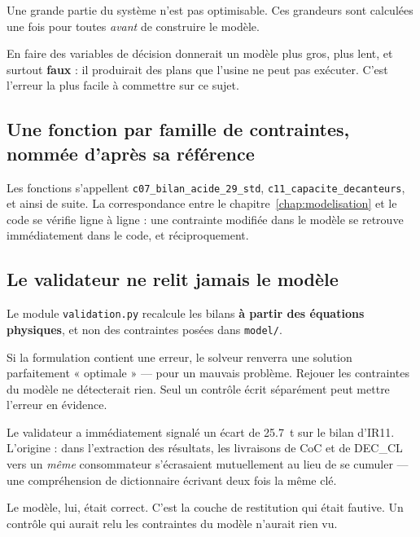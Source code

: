Une grande partie du système n'est pas optimisable. Ces grandeurs sont calculées une fois
pour toutes \emph{avant} de construire le modèle.

\begin{encadre}[title={Pourquoi c'est important}]
En faire des variables de décision donnerait un modèle plus gros, plus lent, et surtout
\textbf{faux} : il produirait des plans que l'usine ne peut pas exécuter. C'est l'erreur la
plus facile à commettre sur ce sujet.
\end{encadre}

\subsection{Une fonction par famille de contraintes, nommée d'après sa référence}

Les fonctions s'appellent \texttt{c07\_bilan\_acide\_29\_std},
\texttt{c11\_capacite\_decanteurs}, et ainsi de suite. La correspondance entre le
chapitre~\ref{chap:modelisation} et le code se vérifie ligne à ligne : une contrainte
modifiée dans le modèle se retrouve immédiatement dans le code, et réciproquement.

\subsection{Le validateur ne relit jamais le modèle}

Le module \texttt{validation.py} recalcule les bilans \textbf{à partir des équations
physiques}, et non des contraintes posées dans \texttt{model/}.

\begin{encadre}[title={Le principe de double vérification}]
Si la formulation contient une erreur, le solveur renverra une solution parfaitement
« optimale » --- pour un mauvais problème. Rejouer les contraintes du modèle ne détecterait
rien. Seul un contrôle écrit séparément peut mettre l'erreur en évidence.
\end{encadre}

\begin{resultat}[title={Ce principe a payé dès le premier passage}]
Le validateur a immédiatement signalé un écart de \SI{25,7}{\tonne} sur le bilan d'IR11.
L'origine : dans l'extraction des résultats, les livraisons de CoC et de DEC\_CL vers un
\emph{même} consommateur s'écrasaient mutuellement au lieu de se cumuler --- une
compréhension de dictionnaire écrivant deux fois la même clé.

Le modèle, lui, était correct. C'est la couche de restitution qui était fautive. Un contrôle
qui aurait relu les contraintes du modèle n'aurait rien vu.
\end{resultat}

